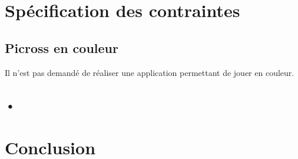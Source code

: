 \documentclass{report}
\begin{document}
\chapter{Spécification des contraintes}

	\section{Picross en couleur}
		Il n'est pas demandé de réaliser une application permettant de jouer en couleur. 
		
	\section{•}
			
\chapter{Conclusion}
		
		
\end{document}
